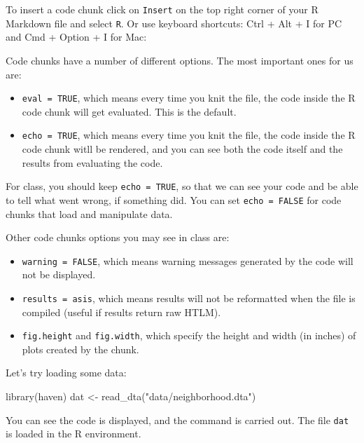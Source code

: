 \documentclass[
  letterpaper,
  DIV=11,
  numbers=noendperiod]{scrreprt}
\newenvironment{Shaded}{\begin{snugshade}}{\end{snugshade}}
\newcommand{\FunctionTok}[1]{\textcolor[rgb]{0.02,0.16,0.49}{#1}}
\newcommand{\NormalTok}[1]{\textcolor[rgb]{0.00,0.44,0.13}{#1}}
\newcommand{\OtherTok}[1]{\textcolor[rgb]{0.00,0.44,0.13}{#1}}
\newcommand{\StringTok}[1]{\textcolor[rgb]{0.25,0.44,0.63}{#1}}
\providecommand{\tightlist}{%
  \setlength{\itemsep}{0pt}\setlength{\parskip}{0pt}}\usepackage{longtable,booktabs,array}
\begin{document}
To insert a code chunk click on \texttt{Insert} on the top right corner
of your R Markdown file and select \texttt{R}. Or use keyboard
shortcuts: Ctrl + Alt + I for PC and Cmd + Option + I for Mac:

Code chunks have a number of different options. The most important ones
for us are:

\begin{itemize}
\tightlist
\item
  \texttt{eval\ =\ TRUE}, which means every time you knit the file, the
  code inside the R code chunk will get evaluated. This is the default.
\item
  \texttt{echo\ =\ TRUE}, which means every time you knit the file, the
  code inside the R code chunk witll be rendered, and you can see both
  the code itself and the results from evaluating the code.
\end{itemize}

For class, you should keep \texttt{echo\ =\ TRUE}, so that we can see
your code and be able to tell what went wrong, if something did. You can
set \texttt{echo\ =\ FALSE} for code chunks that load and manipulate
data.

Other code chunks options you may see in class are:

\begin{itemize}
\tightlist
\item
  \texttt{warning\ =\ FALSE}, which means warning messages generated by
  the code will not be displayed.
\item
  \texttt{results\ =\ \textquotesingle{}asis\textquotesingle{}}, which
  means results will not be reformatted when the file is compiled
  (useful if results return raw HTLM).
\item
  \texttt{fig.height} and \texttt{fig.width}, which specify the height
  and width (in inches) of plots created by the chunk.
\end{itemize}

Let's try loading some data:

\begin{Shaded}
\begin{Highlighting}[]
\FunctionTok{library}\NormalTok{(haven)}
\NormalTok{dat }\OtherTok{\textless{}{-}} \FunctionTok{read\_dta}\NormalTok{(}\StringTok{"data/neighborhood.dta"}\NormalTok{)}
\end{Highlighting}
\end{Shaded}

You can see the code is displayed, and the command is carried out. The
file \texttt{dat} is loaded in the R environment.
\end{document}
